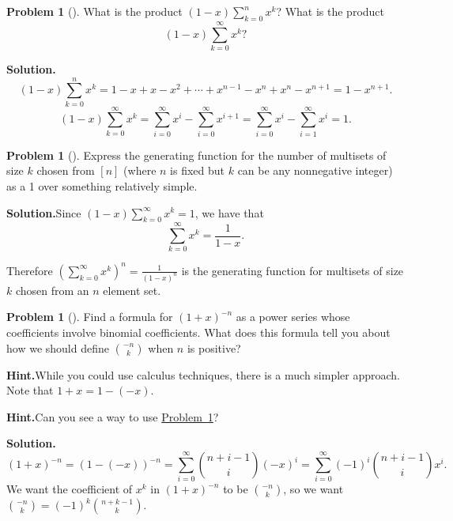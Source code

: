 \documentclass[10pt,]{book}
\theoremstyle{plain}
\theoremstyle{definition}
\newtheorem{activity}[project]{Problem}
\theoremstyle{definition}
\numberwithin{equation}{chapter}
\begin{document}
\begin{activity}[]\label{activity-193}
What is the product \((1-x)\sum_{k=0}^n x^k\)? What is the product%
\begin{equation*}
(1-x)\sum_{k=0}^\infty x^k?
\end{equation*}
%
\par\medskip\noindent%
\textbf{Solution.}\quad %
\begin{equation*}
(1-x)\sum_{k=0}^n x^k=1-x+x-x^2+\cdots+x^{n-1}-x^n+x^n-x^{n+1} =
1-x^{n+1}.
\end{equation*}
%
\begin{equation*}
(1-x)\sum_{k=0}^\infty x^k=\sum_{i=0}^\infty x^i-\sum_{i=0}^\infty
x^{i+1}=\sum_{i=0}^\infty x^i-\sum_{i=1}^\infty x^i = 1.
\end{equation*}
%
\end{activity}
\begin{activity}[]\label{multisetgenfn}
Express the generating function for the number of multisets of size \(k\) chosen from \([n]\) (where \(n\) is fixed but \(k\) can be any nonnegative integer) as a 1 over something relatively simple.%
\par\medskip\noindent%
\textbf{Solution.}\quad Since \((1-x)\sum_{k=0}^\infty x^k=1\), we have that%
\begin{equation*}
\sum_{k=0}^\infty x^k=\frac{1}{1-x}.
\end{equation*}
%
\par
Therefore \(\left(\sum_{k=0}^\infty
x^k\right)^n= \frac{1}{(1-x)^n}\) is the generating function for multisets of size \(k\) chosen from an \(n\) element set.%
\end{activity}
\begin{activity}[]\label{negnchoosek}
Find a formula for \((1+x)^{-n}\) as a power series whose coefficients involve binomial coefficients. What does this formula tell you about how we should define \(\binom{-n}{k}\) when \(n\) is positive?%
\par\medskip\noindent%
\textbf{Hint.}\quad While you could use calculus techniques, there is a much simpler approach. Note that \(1 + x = 1 - (-x)\).%
\par\medskip\noindent%
\textbf{Hint.}\quad Can you see a way to use \hyperref[multisetgenfn]{Problem~\ref{multisetgenfn}}?%
\par\medskip\noindent%
\textbf{Solution.}\quad %
\begin{equation*}
(1+x)^{-n}=(1-(-x))^{-n}=\sum_{i=0}^\infty
\binom{n+i-1}{i}(-x)^i=\sum_{i=0}^\infty (-1)^i\binom{n+i-1}{i}x^i.
\end{equation*}
We want the coefficient of \(x^k\) in \((1+x)^{-n}\) to be \(\binom{-n}{k}\), so we want \(\binom{-n}{k}= (-1)^k\binom{n+k-1}{k}\).%
\end{activity}
\end{document}
